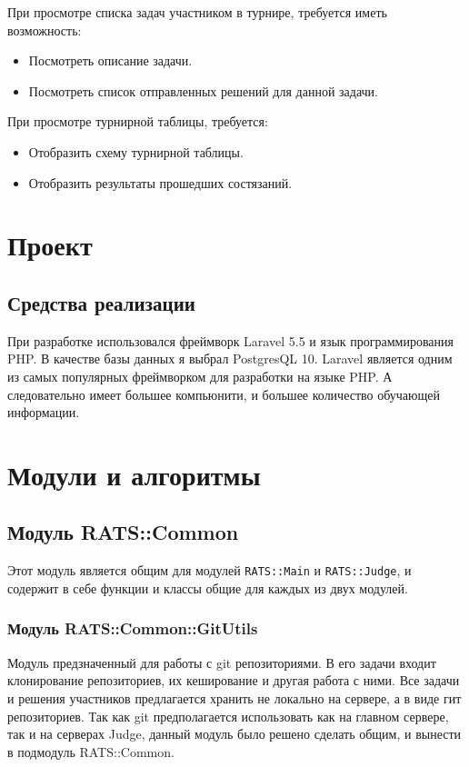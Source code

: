 \documentclass[a4paper,12pt]{article}
\begin{document}
При просмотре списка задач участником в турнире, требуется иметь возможность:
\begin{itemize}
    \item Посмотреть описание задачи.
    \item Посмотреть список отправленных решений для данной задачи.
\end{itemize}

При просмотре турнирной таблицы, требуется:
\begin{itemize}
    \item Отобразить схему турнирной таблицы.
    \item Отобразить результаты прошедших состязаний.
\end{itemize}

\section{Проект}
\subsection{Средства реализации}
При разработке использовался фреймворк Laravel 5.5 и язык программирования PHP. В качестве базы данных я выбрал PostgresQL 10. Laravel является одним из самых популярных фреймворком для разработки на языке PHP. А следовательно имеет большее компьюнити, и большее количество обучающей информации. 

\section{Модули и алгоритмы}
\subsection{Модуль RATS::Common}
Этот модуль является общим для модулей \verb+RATS::Main+ и \verb+RATS::Judge+, и содержит в себе функции и классы общие для каждых из двух модулей. 
\subsubsection{Модуль RATS::Common::GitUtils}
Модуль предзначенный для работы с git репозиториями. В его задачи входит клонирование репозиториев, их кеширование и другая работа с ними. Все задачи и решения участников предлагается хранить не локально на сервере, а в виде гит репозиториев. Так как git предполагается использовать как на главном сервере, так и на серверах Judge, данный модуль было решено сделать общим, и вынести в подмодуль RATS::Common.
\end{document}
